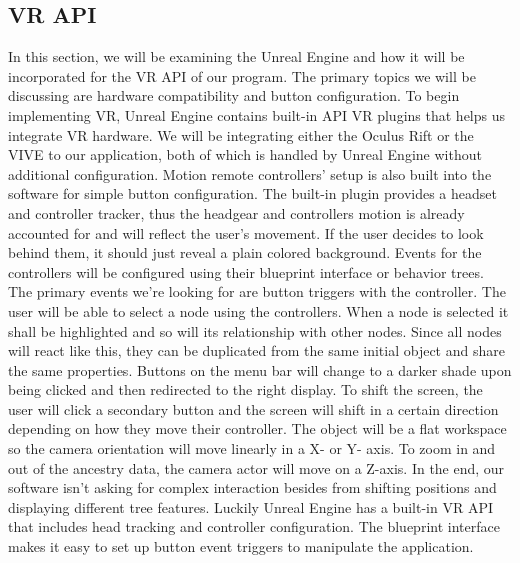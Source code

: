 \documentclass[onecolumn, draftclsnofoot, 10pt, compsoc]{IEEEtran}
\begin{document}
\subsection{VR API}
\begin{singlespace}
In this section, we will be examining the Unreal Engine and how it will be incorporated for the VR API of our program. The primary topics we will be discussing are hardware compatibility and button configuration.
\newline
\newline
To begin implementing VR, Unreal Engine contains built-in API VR plugins that helps us integrate VR hardware. We will be integrating either the Oculus Rift or the VIVE to our application, both of which is handled by Unreal Engine without additional configuration. Motion remote controllers’ setup is also built into the software for simple button configuration. The built-in plugin provides a headset and controller tracker, thus the headgear and controllers motion is already accounted for and will reflect the user’s movement. If the user decides to look behind them, it should just reveal a plain colored background. 
\newline
\newline
Events for the controllers will be configured using their blueprint interface or behavior trees. The primary events we’re looking for are button triggers with the controller. The user will be able to select a node using the controllers. When a node is selected it shall be highlighted and so will its relationship with other nodes. Since all nodes will react like this, they can be duplicated from the same initial object and share the same properties. Buttons on the menu bar will change to a darker shade upon being clicked and then redirected to the right display. 
\newline
\newline
To shift the screen, the user will click a secondary button and the screen will shift in a certain direction depending on how they move their controller. The object will be a flat workspace so the camera orientation will move linearly in a X- or Y- axis. To zoom in and out of the ancestry data, the camera actor will move on a Z-axis. 
\newline
\newline
In the end, our software isn’t asking for complex interaction besides from shifting positions and displaying different tree features. Luckily Unreal Engine has a built-in VR API that includes head tracking and controller configuration. The blueprint interface makes it easy to set up button event triggers to manipulate the application.


\end{singlespace}
\end{document}
